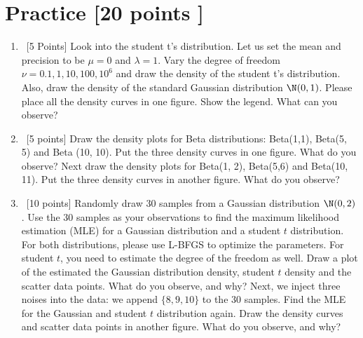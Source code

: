 \documentclass[12pt, fullpage,letterpaper]{article}
\begin{document}
\section{Practice [20 points ]}
\begin{enumerate}
	\item~[5 Points] Look into the student t's distribution. Let us set the mean and precision to be $\mu = 0$ and $\lambda = 1$. Vary the degree of freedom $\nu = {0.1, 1, 10, 100, 10^6}$ and draw the density of the student t's distribution. Also, draw the density of the standard Gaussian distribution $\N(0,1)$. Please place all the density curves in one figure. Show the legend. What can you observe?
	
	\item~[5 points] Draw the density plots for Beta distributions: Beta(1,1), Beta(5, 5) and Beta (10, 10). Put the three density curves in one figure. What do you observe? Next draw the density plots for Beta(1, 2), Beta(5,6) and Beta(10, 11). Put the three density curves in another figure. What do you observe?
	
	
	\item~[10 points] Randomly draw 30 samples from a Gaussian distribution $\N(0, 2)$. Use the 30 samples as your observations to find the maximum likelihood estimation (MLE) for a Gaussian distribution and a student $t$ distribution. For both distributions, please use L-BFGS to optimize the parameters. For student $t$, you need to estimate the degree of the freedom as well. Draw a plot of the estimated the Gaussian distribution density, student $t$ density and the scatter data points. What do you observe, and why? Next, we inject three noises into the data: we append $\{8, 9, 10\}$ to the $30$ samples. Find the MLE for the Gaussian and student $t$ distribution again. Draw the density curves and scatter data points in another figure. What do you observe, and why? 
	
	
	

	
\end{enumerate}
\end{document}
